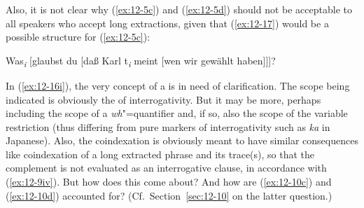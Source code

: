 \documentclass[output=paper]{langsci/langscibook}
\begin{document}
Also, it is not clear why (\ref{ex:12-5c}) and (\ref{ex:12-5d}) should not be acceptable to
all speakers who accept long extractions, given that (\ref{ex:12-17}) would be a
possible structure for (\ref{ex:12-5c}):
\begin{exe}
\ex
\label{ex:12-17}
Was\textsubscript{\textit{i}} [glaubst du [daß Karl t\textsubscript{\textit{i}} meint [wen wir gewählt haben]]]?
\end{exe}        
In (\ref{ex:12-16i}), the very concept of a  is in need of
clarification.  The scope being indicated is obviously the  of
interrogativity. But it may be more, perhaps including the scope of a
\emph{wh}"=quantifier and, if so, also the scope of the variable
restriction (thus differing from pure markers of interrogativity such
as \textit{ka} in Japanese). Also, the coindexation is obviously meant
to have similar consequences like coindexation of a long extracted
phrase and its trace(s), so that the complement is not evaluated as an
interrogative clause, in accordance with (\ref{ex:12-9iv}). But how does this
come about?  And how are (\ref{ex:12-10c}) and (\ref{ex:12-10d}) accounted for? (Cf.\ Section~\ref{sec:12-10} on the latter question.)
\end{document}
